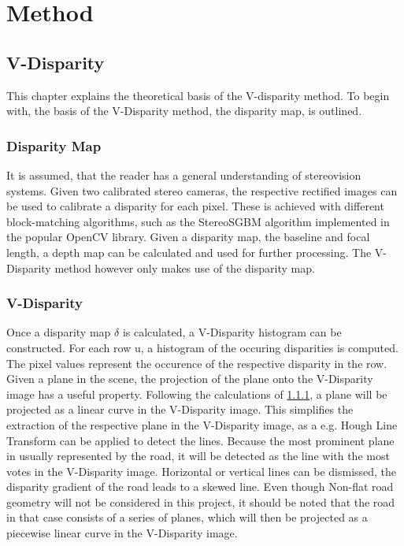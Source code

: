 
\chapter{Method}
\label{chp:Method}

\section{V-Disparity}

This chapter explains the theoretical basis of the V-disparity method. To begin with, the basis of the V-Disparity method, the disparity map, is outlined. 

\subsection{Disparity Map} \label{sbs:method_dispmap}
It is assumed, that the reader has a general understanding of stereovision systems. Given two calibrated stereo cameras, the respective rectified images can be used to calibrate a disparity for each pixel. These is achieved with different block-matching algorithms, such as the StereoSGBM algorithm implemented in the popular OpenCV library. Given a disparity map, the baseline and focal length, a depth map can be calculated and used for further processing. The V-Disparity method however only makes use of the disparity map.



\subsection{V-Disparity}

Once a disparity map $\delta$ is calculated, a V-Disparity histogram can be constructed. For each row u, a histogram of the occuring disparities is computed. The pixel values represent the occurence of the respective disparity in the row. Given a plane in the scene, the projection of the plane onto the V-Disparity image has a useful property. Following the calculations of \ref{sbs:method_dispmap}, a plane will be projected as a linear curve in the V-Disparity image. This simplifies the extraction of the respective plane in the V-Disparity image, as a e.g. Hough Line Transform can be applied to detect the lines.
\newline
Because the most prominent plane in usually represented by the road, it will be detected as the line with the most votes in the V-Disparity image. Horizontal or vertical lines can be dismissed, the disparity gradient of the road leads to a skewed line.
Even though Non-flat road geometry will not be considered in this project, it should be noted that the road in that case consists of a series of planes, which will then be projected as a piecewise linear curve in the V-Disparity image.

